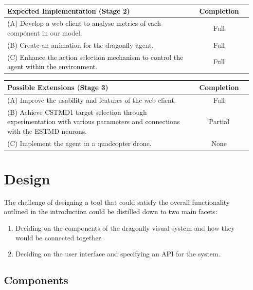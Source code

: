 \documentclass[a4paper,11pt]{article}
\begin{document}
\begin{center}
    \begin{tabular}{p{12cm} c c}
    \textbf{Expected Implementation (Stage 2)} & \textbf{Completion} \\ \hline
	(A) Develop a web client to analyse metrics of each component in our model. & Full \\
	(B) Create an animation for the dragonfly agent. & Full\\
	(C) Enhance the action selection mechanism to control the agent within the environment. & Full\\
    \end{tabular}
\end{center}

\begin{center}
    \begin{tabular}{p{12cm} c c}
    \textbf{Possible Extensions (Stage 3)} & \textbf{Completion} \\ \hline
	(A) Improve the usability and features of the web client. & Full\\
	(B) Achieve CSTMD1 target selection through experimentation with various parameters and connections with the ESTMD neurons. & Partial\\
	(C) Implement the agent in a quadcopter drone. & None\\
    \end{tabular}
\end{center}






\clearpage
\section{Design}

The challenge of designing a tool that could satisfy the overall functionality outlined in the introduction could be distilled down to two main facets:
\begin{enumerate}
\item Deciding on the components of the dragonfly visual system and how they would be connected together.
\item Deciding on the user interface and specifying an API for the system.
\end{enumerate}

\subsection{Components}
\end{document}
